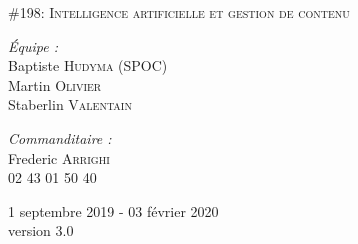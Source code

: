 \begin{titlepage}
\begin{center}
\vspace{0.4cm}
\textsc {\large \#198: Intelligence artificielle et gestion de contenu }\\[1.5cm]

\vspace{7cm}

\begin{minipage}{0.4\textwidth}
\begin{flushleft} \large
	\emph{Équipe :}\\
	Baptiste \textsc{Hudyma} (SPOC)\\
	Martin \textsc{Olivier}\\
	Staberlin \textsc{Valentain}
\end{flushleft}
\end{minipage}
\begin{minipage}{0.5\textwidth}
\begin{flushright} \large
	\emph{Commanditaire :}\\
	Frederic \textsc{Arrighi}\\
	02 43 01 50 40
\end{flushright}
\end{minipage}

\vfill

{\large 1\ier{} septembre 2019 - 03 février 2020}\\
{version 3.0}

\end{center}
\end{titlepage}
